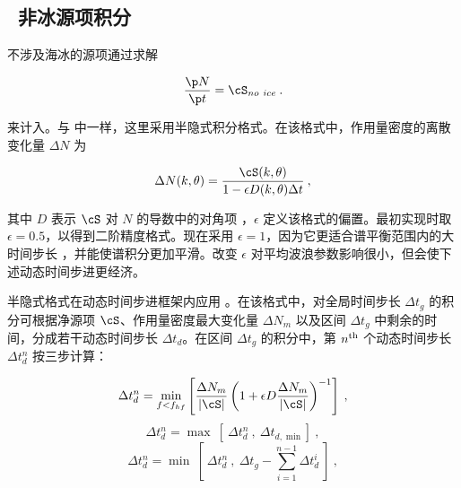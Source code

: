 \vssub
\subsection{~非冰源项积分} \label{sub:source}
\vssub

不涉及海冰的源项通过求解


\begin{equation}
\frac{\p N}{\p t} = \cS_{no~ice} \: . \label{eq:step_source}
\end{equation}

\noindent 
来计入。与 \wam{} 中一样，这里采用半隐式积分格式。在该格式中，作用量密度的离散变化量 $\Delta N$ 为 \citep{art:WAM88}


\begin{equation}
\Delta N(k,\theta) = \frac{\cS(k,\theta)}{1- \epsilon D(k,\theta)\Delta t}
\: , \label{eq:implicit_st} \end{equation}

\noindent 
其中 $D$ 表示 $\cS$ 对 $N$ 的导数中的对角项 \citep[Eqs. 4.1 through 4.10]{art:WAM88}，$\epsilon$ 定义该格式的偏置。最初实现时取 $\epsilon = 0.5$，以得到二阶精度格式。现在采用 $\epsilon = 1$，因为它更适合谱平衡范围内的大时间步长 \citep{pro:HA98,art:HA01}，并能使谱积分更加平滑。改变 $\epsilon$ 对平均波浪参数影响很小，但会使下述动态时间步进更经济。

半隐式格式在动态时间步进框架内应用 \citep{tol:JPO92}。在该格式中，对全局时间步长 $\Delta t_g$ 的积分可根据净源项 $\cS$、作用量密度最大变化量 $\Delta N_m$ 以及区间 $\Delta t_g$ 中剩余的时间，分成若干动态时间步长 $\Delta t_d$。在区间 $\Delta t_g$ 的积分中，第 $n^{\rm th}$ 个动态时间步长 $\Delta t_d^n$ 按三步计算：


\begin{equation}
\Delta t_d^n = 
\min_{f<f_{hf}} \left [ \frac{\Delta N_m}{|\cS|}
\left ( 1 + \epsilon D \frac{\Delta N_m}{|\cS|} \right ) ^{-1}
\right ] \: , \label{eq:st_d_1}
\end{equation} \begin{equation}
\Delta t_d^n = \max \: \left [ \: \Delta t_d^n \: , \: 
\Delta t_{d,\min} \right ] \: , \label{eq:st_d_2a}
\end{equation} \begin{equation}
\Delta t_d^n = \min \: \left [ \: \Delta t_d^n \: , \: 
\Delta t_g - \sum_{i=1}^{n-1} \Delta t_d^i
 \: \right ] \: , \label{eq:st_d_2b}
\end{equation}

